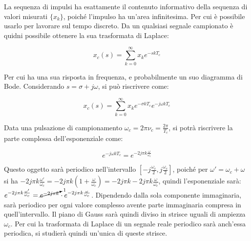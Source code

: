 \documentclass{article}
\numberwithin{equation}{subsection}
\begin{document}
\begin{center}
\end{center}

La sequenza di impulsi ha esattamente il contenuto informativo della sequenza di valori misurati $\{x_k\}$, poiché l'impulso ha un'area infinitesima. Per cui è possibile 
usarlo per lavorare sul tempo discreto. Da un qualsiasi segnale campionato è quidni possibile ottenere la sua trasformata di Laplace:

\begin{equation}
    x_c(s)=\sum_{k=0}^{\infty}\displaystyle{x_k}e^{-skT_c}
\end{equation}

Per cui ha una sua risposta in frequenza, e probabilmente un suo diagramma di Bode. Considerando $s=\sigma +j\omega$, si può riscrivere come: 

\begin{equation}
    x_c(s)=\sum_{k=0}^{\infty}x_ke^{-\sigma kT_c}e^{-j\omega kT_c}
\end{equation}

Data una pulsazione di campionamento $\omega_c=2\pi\nu_c=\displaystyle\frac{2\pi}{T_c}$, si potrà riscrivere la parte complessa dell'esponenziale come:

\begin{equation}
    e^{-j\omega kT_c}=e^{-2j\pi k\frac{\omega}{\omega_c}}
\end{equation}

Questo oggetto sarà periodico nell'intervallo $\left[\displaystyle-j\frac{\omega_c}{2},j\frac{\omega_c}{2}\right]$, poiché per $\omega'=\omega_c+\omega$ si ha 
$-2j\pi k\displaystyle\frac{\omega'}{\omega_c}=-2j\pi k\left(1+\frac{\omega}{\omega_c}\right)=-2j\pi k-2j\pi k\frac{\omega}{\omega_c}$, quindi l'esponenziale sarà: 
$e^{-2j\pi k\frac{\omega'}{\omega_c}}=\cancelto{1}{e^{-2j\pi k}}\cdot e^{-2j\pi k\frac{\omega}{\omega_c}}$. Dipendendo dalla sola componente immaginaria, sarà 
periodico per ogni valore complesso avente parte immaginaria compresa in quell'intervallo. Il piano di Gauss sarà quindi diviso in strisce uguali di ampiezza $\omega_c$. 
Per cui la trasformata di Laplace di un segnale reale periodico sarà anch'essa periodica, si studierà quindi un'unica di queste strisce. 
\end{document}
